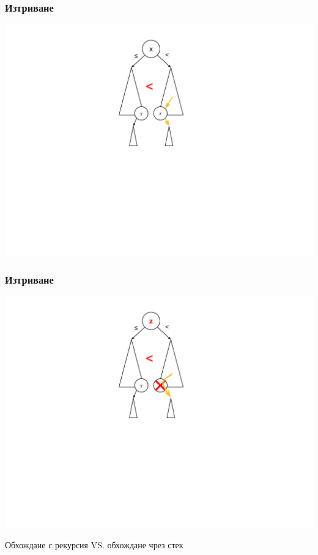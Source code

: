 \documentclass{beamer}
\begin{document}
\begin{frame}[fragile]
\frametitle{Изтриване}

\includegraphics[width=14cm]{images/tree_delete_2}

\end{frame}


\begin{frame}[fragile]
\frametitle{Изтриване}

\includegraphics[width=14cm]{images/tree_delete_3}

\end{frame}


\begin{frame}
\centerline{Обхождане с рекурсия VS. обхождане чрез стек}
\end{frame}
\end{document}
